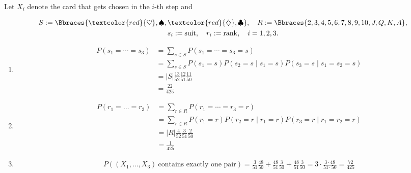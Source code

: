 \begin{solution}

Let $X_i$ denote the card that gets chosen in the $i$-th step and

\begin{gather*}
    S := \Bbraces{\textcolor{red}{\heartsuit}, \spadesuit, \textcolor{red}{\diamondsuit}, \clubsuit},
    \quad
    R := \Bbraces{2, 3, 4, 5, 6, 7, 8, 9, 10, J, Q, K, A}, \\
    s_i := \operatorname{suit},
    \quad
    r_i := \operatorname{rank},
    \quad
    i = 1, 2, 3.
\end{gather*}

\begin{enumerate}[label = (\alph*)]

    \item

    \begin{align*}
        P(s_1 = \cdots = s_3)
        & =
        \sum_{s \in S} P(s_1 = \cdots = s_3 = s) \\
        & =
        \sum_{s \in S} P(s_1 = s) P(s_2 = s \mid s_1 = s) P(s_3 = s \mid s_1 = s_2 = s) \\
        & =
        |S| \frac{13}{52} \frac{12}{51} \frac{11}{50} \\
        & =
        \frac{22}{425}
    \end{align*}

    \item

    \begin{align*}
        P(r_1 = \dots = r_3)
        & =
        \sum_{r \in R} P(r_1 = \cdots = r_3 = r) \\
        & =
        \sum_{r \in R} P(r_1 = r) P(r_2 = r \mid r_1 = r) P(r_3 = r \mid r_1 = r_2 = r) \\
        & =
        |R| \frac{4}{52} \frac{3}{51} \frac{2}{50} \\
        & =
        \frac{1}{425}
    \end{align*}

    \item

    \begin{align*}
        P((X_1, \dots, X_3) ~\text{contains exactly one pair})
        =
        \frac{3}{51} \frac{48}{50}
        +
        \frac{48}{51} \frac{3}{50}
        +
        \frac{48}{51} \frac{3}{50}
        =
        3 \cdot \frac{3 \cdot 48}{51 \cdot 50}
        =
        \frac{72}{425}
    \end{align*}


\end{enumerate}
\end{solution}
